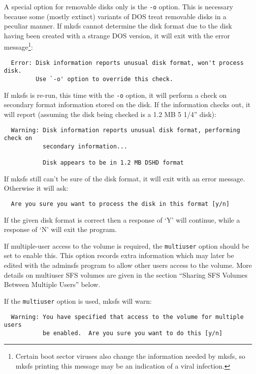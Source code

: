 A special option for removable disks only is the {\tt -o} option.  This is
necessary because some (mostly extinct) variants of DOS treat removable disks
in a peculiar manner.  If mksfs cannot determine the disk format due to the
disk having been created with a strange DOS version, it will exit with the
error message\footnote{
              Certain boot sector viruses also change the information needed by
              mksfs, so mksfs printing this message may be an indication of a
              viral infection.
}:

{\small
\begin{verbatim}
  Error: Disk information reports unusual disk format, won't process disk.
         Use `-o' option to override this check.
\end{verbatim}}

If mksfs is re-run, this time with the {\tt -o} option, it will perform a check on
secondary format information stored on the disk.  If the information checks
out, it will report (assuming the disk being checked is a 1.2 MB 5 1/4'' disk):

{\small
\begin{verbatim}
  Warning: Disk information reports unusual disk format, performing check on
           secondary information...

           Disk appears to be in 1.2 MB DSHD format
\end{verbatim}}

If mksfs still can't be sure of the disk format, it will exit with an error
message.  Otherwise it will ask:

\begin{verbatim}
  Are you sure you want to process the disk in this format [y/n]
\end{verbatim}

If the given disk format is correct then a response of `Y' will continue, while
a response of `N' will exit the program.

If multiple-user access to the volume is required, the {\tt multiuser} option
should be set to enable this.  This option records extra information which may
later be edited with the adminsfs program to allow other users access to the
volume.  More details on multiuser SFS volumes are given in the section
``Sharing SFS Volumes Between Multiple Users'' below.

If the {\tt multiuser} option is used, mksfs will warn:

{\small
\begin{verbatim}
  Warning: You have specified that access to the volume for multiple users
           be enabled.  Are you sure you want to do this [y/n]
\end{verbatim}}


